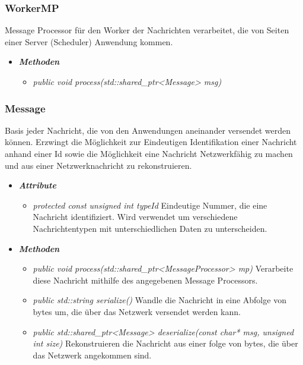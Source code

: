 \documentclass[a4paper,12pt]{article}
\begin{document}
\subsubsection{WorkerMP}

Message Processor für den Worker der Nachrichten verarbeitet, die von Seiten einer Server (Scheduler) Anwendung kommen.

	\begin{itemize}[label={}]

	\item\textit{\textbf{Methoden}}
		\begin{itemize}[label={\textbullet}]
			\item\textit{public void process(std::shared\_ptr<Message> msg)}

		\end{itemize}

\end{itemize}


\subsubsection{Message}

Basis jeder Nachricht, die von den Anwendungen aneinander versendet werden können. Erzwingt die Möglichkeit zur Eindeutigen Identifikation einer Nachricht anhand einer Id sowie die Möglichkeit eine Nachricht Netzwerkfähig zu machen und aus einer Netzwerknachricht zu rekonstruieren.

	\begin{itemize}[label={}]

	\item\textit{\textbf{Attribute}}
		\begin{itemize}[label={\textbullet}]
			\item\textit{protected const unsigned int typeId} Eindeutige Nummer, die eine Nachricht identifiziert. Wird verwendet um verschiedene Nachrichtentypen mit unterschiedlichen Daten zu unterscheiden.
			
		\end{itemize}

	\item\textit{\textbf{Methoden}}
		\begin{itemize}[label={\textbullet}]
			\item\textit{public void process(std::shared\_ptr<MessageProcessor> mp)} Verarbeite diese Nachricht mithilfe des angegebenen Message Processors.
			\item\textit{public std::string serialize()} Wandle die Nachricht in eine Abfolge von bytes um, die über das Netzwerk versendet werden kann.
			\item\textit{public std::shared\_ptr<Message> deserialize(const char* msg, unsigned int size)} Rekonstruieren die Nachricht aus einer folge von bytes, die über das Netzwerk angekommen sind.

		\end{itemize}

\end{itemize}
\end{document}
